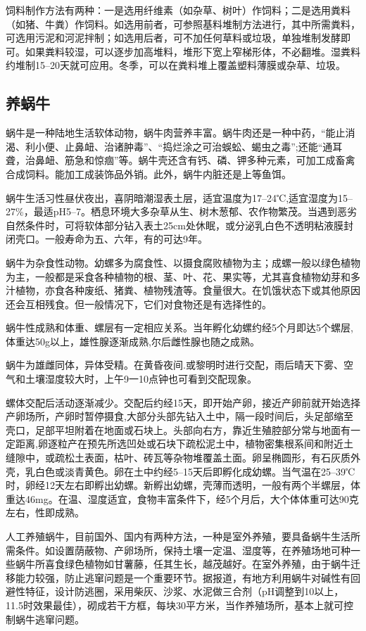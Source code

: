 \documentclass{ctexbook}
\begin{document}
饲料制作方法有两种：一是选用纤维素（如杂草、树叶）作饲料；二是选用粪料（如猪、牛粪）作饲料。如选用前者，可参照基料堆制方法进行，其中所需粪料，可选用污泥和河泥拌制；如选用后者，可不加任何草料或垃圾，单独堆制发酵即可。如果粪料较湿，可以逐步加高堆料，堆形下宽上窄梯形体，不必翻堆。湿粪料约堆制15--20天就可应用。冬季，可以在粪料堆上覆盖塑料薄膜或杂草、垃圾。
\subsection{养蜗牛}
蜗牛是一种陆地生活软体动物，蜗牛肉营养丰富。蜗牛肉还是一种中药，“能止消渴、利小便、止鼻衄、治诸肿毒”、“捣烂涂之可治蜈蚣、蝎虫之毒”;还能“通耳聋，治鼻衄、筋急和惊痼”等。蜗牛壳还含有钙、磷、钾多种元素，可加工成畜禽合成饲料。能加工成装饰品外销。此外，蜗牛内脏还是上等鱼饵。

蜗牛生活习性昼伏夜出，喜阴暗潮湿表土层，适宜温度为17--24℃,适宜湿度为15--27\%，最适pH5--7。栖息环境大多杂草从生、树木葱郁、农作物繁茂。当遇到恶劣自然条件时，可将软体部分钻入表土25cm处休眠，或分泌乳白色不透明粘液膜封闭壳口。一般寿命为五、六年，有的可达9年。

蜗牛为杂食性动物。幼螺多为腐食性、以摄食腐败植物为主；成螺一般以绿色植物为主，一般都是采食各种植物的根、茎、叶、花、果实等，尤其喜食植物幼芽和多汁植物，亦食各种废纸、猪粪、植物残渣等。食量很大。在饥饿状态下或其他原因还会互相残食。但一般情况下，它们对食物还是有选择性的。

蜗牛性成熟和体重、螺层有一定相应关系。当年孵化幼螺约经5个月即达5个螺层,体重达50g以上，雄性腺逐渐成熟,尔后雌性腺也随之成熟。

蜗牛为雄雌同体，异体受精。在黄昏夜间.或黎明时进行交配，雨后晴天下雾、空气和土壤湿度较大时，上午9一10点钟也可看到交配现象。

螺体交配后活动逐渐减少。交配后约经15天，即开始产卵，接近产卵前就开始选择产卵场所，产卵时暂停摄食,大部分头部先钻入土中，隔一段时间后，头足部缩至壳口，足部平坦附着在地面或石块上。头部向右方，靠近生殖腔部分常与地面有一定距离,卵逐粒产在预先所选凹处或石块下疏松泥土中，植物密集根系间和附近土缝隙中，或疏松土表面，枯叶、砖瓦等杂物堆覆盖土面。卵呈椭圆形，有石灰质外壳，乳白色或淡青黄色。卵在土中约经5--15天后即孵化成幼螺。当气温在25--39℃时，卵经12天左右即孵出幼螺。新孵出幼螺，壳薄而透明，一般有两个半螺层，体重达46mg。在温、湿度适宜，食物丰富条件下，经5个月后，大个体体重可达90克左右，性即成熟。

人工养殖蜗牛，目前国外、国内有两种方法，一种是室外养殖，要具备蜗牛生活所需条件。如设置荫蔽物、产卵场所，保持土壤一定温、湿度等，在养殖场地可种一些蜗牛所喜食绿色植物如甘薯藤，任其生长，越茂越好。在室外养殖，由于蜗牛迁移能力较强，防止逃窜问题是一个重要环节。据报道，有地方利用蜗牛对碱性有回避性特征，设计防逃圈，采用柴灰、沙浆、水泥做三合剂（pH调整到10以上，11.5时效果最佳），砌成若干方框，每块30平方米，当作养殖场所，基本上就可控制蜗牛逃窜问题。
\end{document}
